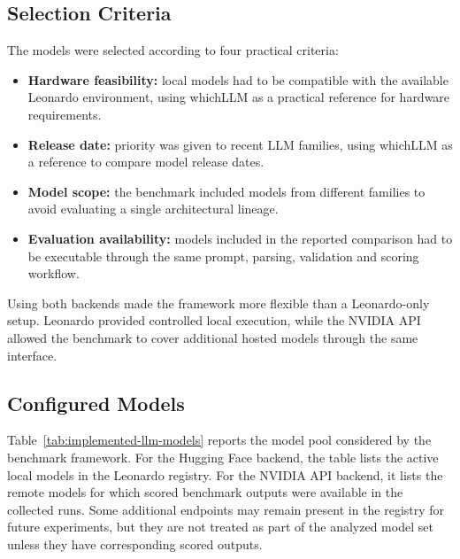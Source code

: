\subsection{Selection Criteria}

The models were selected according to four practical criteria:

\begin{itemize}
    \item \textbf{Hardware feasibility:} local models had to be compatible with the available Leonardo environment, using whichLLM as a practical reference for hardware requirements.
    \item \textbf{Release date:} priority was given to recent LLM families, using whichLLM as a reference to compare model release dates.
    \item \textbf{Model scope:} the benchmark included models from different families to avoid evaluating a single architectural lineage.
    \item \textbf{Evaluation availability:} models included in the reported comparison had to be executable through the same prompt, parsing, validation and scoring workflow.
\end{itemize}

Using both backends made the framework more flexible than a Leonardo-only setup. Leonardo provided controlled local execution, while the NVIDIA API allowed the benchmark to cover additional hosted models through the same interface.

\subsection{Configured Models}

Table~\ref{tab:implemented-llm-models} reports the model pool considered by the benchmark framework. For the Hugging Face backend, the table lists the active local models in the Leonardo registry. For the NVIDIA API backend, it lists the remote models for which scored benchmark outputs were available in the collected runs. Some additional endpoints may remain present in the registry for future experiments, but they are not treated as part of the analyzed model set unless they have corresponding scored outputs.


